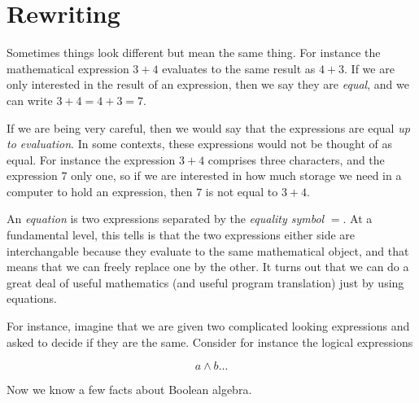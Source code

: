 \chapter{Rewriting}
Sometimes things look different but mean the same thing. For instance the mathematical expression $3+4$ evaluates to the same result as $4+3$. If we are only interested in the result of an expression, then we say they are {\em equal}, and we can write $3+4=4+3=7$.

If we are being very careful, then we would say that the expressions are equal {\em up to evaluation}. In some contexts, these expressions would not be thought of as equal. For instance the expression $3+4$ comprises three characters, and the expression $7$ only one, so if we are interested in how much storage we need in a computer to hold an expression, then $7$ is not equal to $3+4$.

An {\em equation} is two expressions separated by the {\em equality symbol} $=$. At a fundamental level, this tells is that the two expressions either side are interchangable because they evaluate to the same mathematical object, and that means that we can freely replace one by the other. It turns out that we can do a great deal of useful mathematics (and useful program translation) just by using equations.

For instance, imagine that we are given two complicated looking expressions and asked to decide if they are the same. Consider for instance the logical expressions

\[ a \land b... \]

Now we know a few facts about Boolean algebra. 

